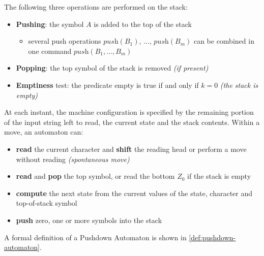 \documentclass[english]{article}
\begin{document}
The following three operations are performed on the stack:

\begin{itemize}
  \item \textbf{Pushing}: the symbol \(A\) is added to the top of the stack
        \begin{itemize}[label=\(\rightarrow\)]
          \item several push operations \(\textit{push}(B_1), \, \ldots, \, \textit{push}(B_m)\) can be combined in one command \(\textit{push}(B_1, \ldots, B_m)\)
        \end{itemize}
  \item \textbf{Popping}: the top symbol of the stack is removed \textit{(if present)}
  \item \textbf{Emptiness} test: the predicate empty is true if and only if \(k=0\) \textit{(the stack is empty)}
\end{itemize}

At each instant, the machine configuration is specified by the remaining portion of the input string left to read, the current state and the stack contents.
Within a move, an automaton can:

\begin{itemize}
  \item \textbf{read} the current character and \textbf{shift} the reading head or perform a move without reading \textit{(spontaneous move)}
  \item \textbf{read} and \textbf{pop} the top symbol, or read the bottom \(Z_0\) if the stack is empty
  \item \textbf{compute} the next state from the current values of the state, character and top-of-stack symbol
  \item \textbf{push} zero, one or more symbols into the stack
\end{itemize}

A formal definition of a Pushdown Automaton is shown in \ref{def:pushdown-automaton}.
\end{document}
